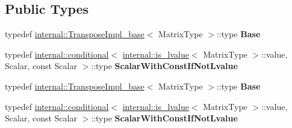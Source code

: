 \subsection*{Public Types}
\begin{DoxyCompactItemize}
\item 
\mbox{\label{class_eigen_1_1_transpose_impl_3_01_matrix_type_00_01_dense_01_4_adca85c1badef95fe3dffea3abd200920}} 
typedef \hyperlink{struct_eigen_1_1internal_1_1_transpose_impl__base}{internal\+::\+Transpose\+Impl\+\_\+base}$<$ Matrix\+Type $>$\+::type {\bfseries Base}
\item 
\mbox{\label{class_eigen_1_1_transpose_impl_3_01_matrix_type_00_01_dense_01_4_a8db358fcda2f858bc1bda7cfafe5b172}} 
typedef \hyperlink{struct_eigen_1_1internal_1_1conditional}{internal\+::conditional}$<$ \hyperlink{struct_eigen_1_1internal_1_1is__lvalue}{internal\+::is\+\_\+lvalue}$<$ Matrix\+Type $>$\+::value, Scalar, const Scalar $>$\+::type {\bfseries Scalar\+With\+Const\+If\+Not\+Lvalue}
\item 
\mbox{\label{class_eigen_1_1_transpose_impl_3_01_matrix_type_00_01_dense_01_4_adca85c1badef95fe3dffea3abd200920}} 
typedef \hyperlink{struct_eigen_1_1internal_1_1_transpose_impl__base}{internal\+::\+Transpose\+Impl\+\_\+base}$<$ Matrix\+Type $>$\+::type {\bfseries Base}
\item 
\mbox{\label{class_eigen_1_1_transpose_impl_3_01_matrix_type_00_01_dense_01_4_a8db358fcda2f858bc1bda7cfafe5b172}} 
typedef \hyperlink{struct_eigen_1_1internal_1_1conditional}{internal\+::conditional}$<$ \hyperlink{struct_eigen_1_1internal_1_1is__lvalue}{internal\+::is\+\_\+lvalue}$<$ Matrix\+Type $>$\+::value, Scalar, const Scalar $>$\+::type {\bfseries Scalar\+With\+Const\+If\+Not\+Lvalue}
\end{DoxyCompactItemize}
